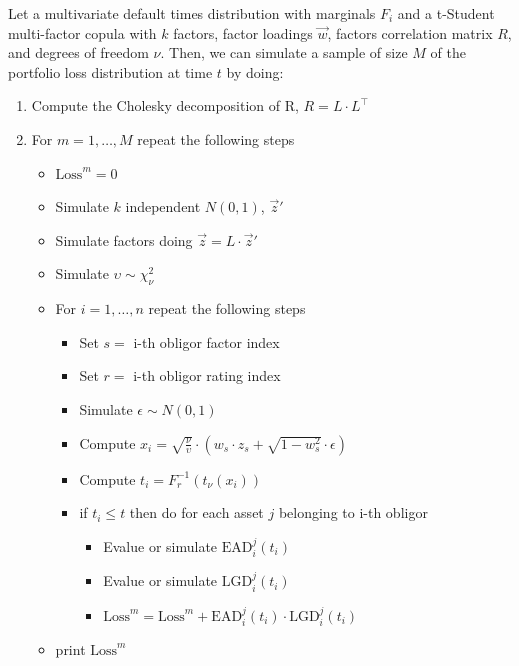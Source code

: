 \documentclass[11pt,fleqn]{book} %
\begin{document}
\begin{algorithm}
	\label{alg:pldmc}
	Let a multivariate default times distribution with marginals $F_i$
	and a t-Student multi-factor copula with $k$ factors, factor loadings 
	$\vec{w}$, factors correlation matrix $R$, and degrees of freedom $\nu$.
	Then, we can simulate a sample of size $M$ of the portfolio loss distribution
	at time $t$ by doing:
	\begin{enumerate}
		\item Compute the Cholesky decomposition of R, $R = L \cdot L^\intercal$
		\item For $m=1,\dots,M$ repeat the following steps
		\begin{itemize}
			\item $\text{Loss}^m = 0$
			\item Simulate $k$ independent $N(0,1)$, $\vec{z}'$
			\item Simulate factors doing $\vec{z} = L \cdot \vec{z}'$
			\item Simulate $\upsilon \sim \chi_{\nu}^2$
			\item For $i=1,\dots,n$ repeat the following steps
			\begin{itemize}
				\item Set $s = $ i-th obligor factor index
				\item Set $r = $ i-th obligor rating index
				\item Simulate $\epsilon \sim N(0,1)$
				\item Compute $x_i = \sqrt{\frac{\nu}{\upsilon}} \cdot \left( w_s \cdot z_s + \sqrt{1-w_s^2} \cdot \epsilon \right)$
				\item Compute $t_i = F_r^{-1}\left(t_{\nu}(x_i)\right)$
				\item if $t_i \le t$ then do for each asset $j$ belonging to i-th obligor
				\begin{itemize}
					\item Evalue or simulate $\text{EAD}_i^j(t_i)$
					\item Evalue or simulate $\text{LGD}_i^j(t_i)$
					\item $\text{Loss}^m = \text{Loss}^m + \text{EAD}_i^j(t_i) \cdot \text{LGD}_i^j(t_i)$
				\end{itemize}
			\end{itemize}
			\item print $\text{Loss}^m$
		\end{itemize}
	\end{enumerate}
\end{algorithm}
\end{document}
